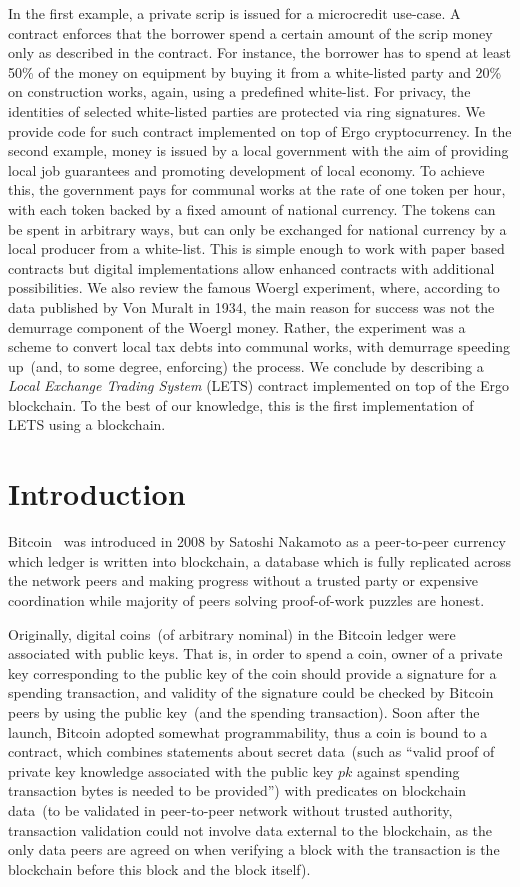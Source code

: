\documentclass[]{llncs}   %
\begin{document}
In the first example, a private scrip is issued for a microcredit use-case. A contract enforces that the borrower spend a certain amount of the scrip money only as described in the contract. For instance, the borrower has to spend at least 50\% of the money on equipment by buying it from a white-listed party and 20\% on construction works, again, using a predefined white-list. For privacy, the identities of selected white-listed parties are protected via ring signatures. We provide code for such contract implemented on top of Ergo cryptocurrency. In the second example, money is issued by a local government with the aim of providing local job guarantees and promoting development of local economy. To achieve this, the government pays for communal works at the rate of one token per hour, with each token backed by a fixed amount of national currency. The tokens can be spent in arbitrary ways, but can only be exchanged for national currency by a local producer from a white-list. This is simple enough to work with paper based contracts but digital implementations allow enhanced contracts with additional possibilities. We also review the famous Woergl experiment, where, according to data published by Von Muralt in 1934, the main reason for success was not the demurrage component of the Woergl money. Rather, the experiment was a scheme to convert local tax debts into communal works, with demurrage speeding up~(and, to some degree, enforcing) the process. We conclude by describing a {\em Local Exchange Trading System} (LETS) contract implemented on top of the Ergo blockchain. To the best of our knowledge, this is the first implementation of LETS using a blockchain.


\section{Introduction}
\label{sec-intro}
 
Bitcoin~\cite{Nakamoto2008} was introduced in 2008 by Satoshi Nakamoto as a peer-to-peer currency which ledger is
written into blockchain, a database which is fully replicated across the network peers and making progress without a trusted
party or expensive coordination while majority of peers solving proof-of-work puzzles are honest.

Originally, digital coins~(of arbitrary nominal) in the Bitcoin ledger were associated with public keys. That is, in order
to spend a coin, owner of a private key corresponding to the public key of the coin should provide a signature for a
spending transaction, and validity of the signature could be checked by Bitcoin peers by using the public key~(and the spending transaction).
Soon after the launch, Bitcoin adopted somewhat programmability, thus a coin is bound to a contract, which combines
statements about secret data~(such as ``valid proof of private key knowledge associated with the public key $pk$
against spending transaction bytes is needed to be provided'') with predicates on blockchain
data~(to be validated in peer-to-peer network without trusted authority, transaction validation could not involve
data external to the blockchain, as the only data peers are agreed on when verifying a block with the transaction
is the blockchain before this block and the block itself).
\end{document}
